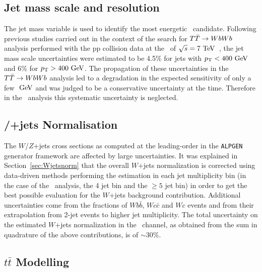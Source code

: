 \subsection{Jet mass scale and resolution}
The jet mass variable is used to identify the most 
energetic \wi\ candidate.
Following previous studies carried out in 
the context of the search for $\TTbar\to WbWb$
analysis performed with the pp collision data
at the \cme\ of $\sqrt{s}=7\tev$~\cite{ATLAS:2012qe}, 
the jet mass scale uncertainties were estimated to be
4.5\% for jets with $\pt<400\gev$ and 6\% for $\pt>400\gev$.
The propagation of these uncertainties in the $\TTbar\to WbWb$
analysis led to a degradation in the expected 
sensitivity of only a few $\gev$ 
and was judged to be a 
conservative uncertainty at the time. 
Therefore in the \wbx\ analysis this systematic uncertainty is neglected.


\subsection{\Wboson/\Zboson+jets Normalisation}
\label{sec:syst_vjetsnormWBX}
The $W$/$Z$+jets cross sections as computed at the
leading-order in the
\texttt{ALPGEN} generator framework
are affected by large uncertainties.
It was explained in Section~\ref{sec:Wjetsnorm}
that the overall $W$+jets normalization is 
corrected using data-driven methods 
performing the estimation in each jet multiplicity
bin (in the case of the \wbx\ analysis, the 4 jet bin
and the $\geq 5$ jet bin) in order to get the best
possible evaluation for the $W$+jets background contribution.
Additional uncertainties come from the fractions of $Wb\bar{b}$, $Wc\bar{c}$ and $Wc$
events and from their extrapolation from 2-jet events to higher jet multiplicity. 
The total uncertainty on the estimated $W$+jets normalization
in the \tight\ channel, as obtained from the  sum in quadrature 
of the above contributions, is of $\sim$30\%.



\subsection{$t\bar{t}$ Modelling}
\label{sec:systematic_ttbarmodel}


